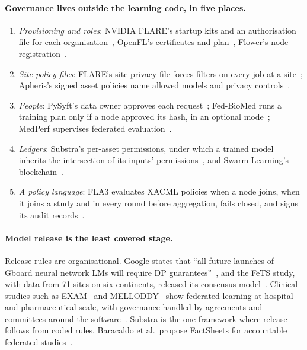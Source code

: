 \paragraph{Governance lives outside the learning code, in five places.}
\begin{enumerate}
  \item \emph{Provisioning and roles}: NVIDIA FLARE's startup kits and an
        authorisation file for each organisation~\citep{nvidia2023flareauthz},
        OpenFL's certificates and plan~\citep{foley2022openfl}, Flower's node
        registration~\citep{flower2026supernodeauth}.
  \item \emph{Site policy files}: FLARE's site privacy file forces filters on
        every job at a site~\citep{nvidia2026flaresitepolicy,nvidia2026flareprivacy};
        Apheris's signed asset policies name allowed models and privacy
        controls~\citep{apheris2026assetpolicies}.
  \item \emph{People}: PySyft's data owner approves each
        request~\citep{ziller2021pysyft}; Fed-BioMed runs a training plan only
        if a node approved its hash, in an optional mode~\citep{cremonesi2025fedbiomed};
        MedPerf supervises federated evaluation~\citep{karargyris2023federated}.
  \item \emph{Ledgers}: Substra's per-asset permissions, under which a trained
        model inherits the intersection of its inputs'
        permissions~\citep{galtier2019substra}, and Swarm Learning's
        blockchain~\citep{warnatherresthal2021swarm}.
  \item \emph{A policy language}: FLA3 evaluates XACML policies when a node joins,
        when it joins a study and in every round before aggregation, fails
        closed, and signs its audit records~\citep{zhang2026building}.
\end{enumerate}

\paragraph{Model release is the least covered stage.} Release rules are
organisational. Google states that ``all future launches of Gboard neural
network LMs will require DP guarantees''~\citep{xu2023federated}, and the FeTS
study, with data from 71 sites on six continents, released its consensus
model~\citep{pati2022federated}. Clinical studies
such as EXAM~\citep{dayan2021federated} and MELLODDY~\citep{heyndrickx2024melloddy}
show federated learning at hospital and pharmaceutical scale, with governance
handled by agreements and committees around the
software~\citep{sheller2020federated,rieke2020future}. Substra is the one
framework where release follows from coded rules. Baracaldo et al.\ propose
FactSheets for accountable federated studies~\citep{baracaldo2022towards}.

